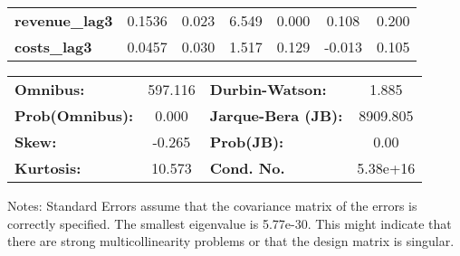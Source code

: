 \begin{center}
\begin{tabular}{lcccccc}
\textbf{revenue\_lag3}                   &       0.1536  &        0.023     &     6.549  &         0.000        &        0.108    &        0.200     \\
\textbf{costs\_lag3}                     &       0.0457  &        0.030     &     1.517  &         0.129        &       -0.013    &        0.105     \\
\bottomrule
\end{tabular}
\begin{tabular}{lclc}
\textbf{Omnibus:}       & 597.116 & \textbf{  Durbin-Watson:     } &    1.885  \\
\textbf{Prob(Omnibus):} &   0.000 & \textbf{  Jarque-Bera (JB):  } & 8909.805  \\
\textbf{Skew:}          &  -0.265 & \textbf{  Prob(JB):          } &     0.00  \\
\textbf{Kurtosis:}      &  10.573 & \textbf{  Cond. No.          } & 5.38e+16  \\
\bottomrule
\end{tabular}
\end{center}

Notes: \newline
 [1] Standard Errors assume that the covariance matrix of the errors is correctly specified. \newline
 [2] The smallest eigenvalue is 5.77e-30. This might indicate that there are \newline
 strong multicollinearity problems or that the design matrix is singular.
